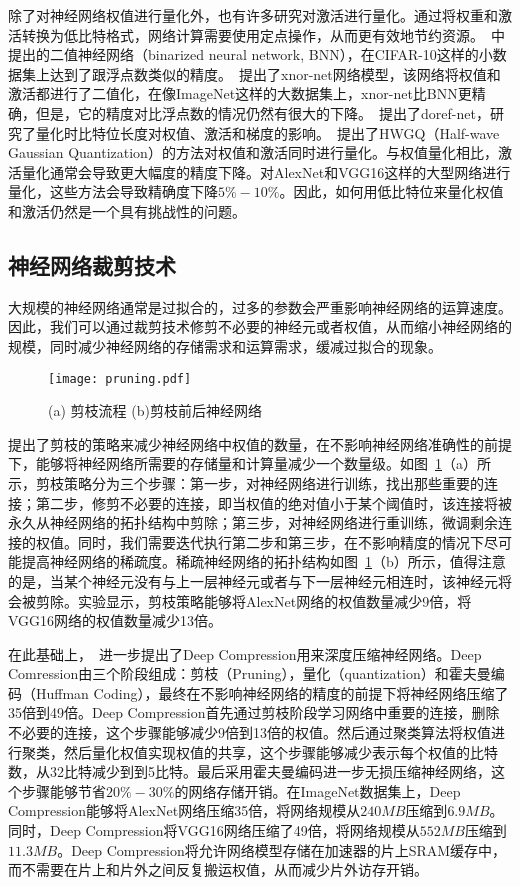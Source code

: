 除了对神经网络权值进行量化外，也有许多研究对激活进行量化。通过将权重和激活转换为低比特格式，网络计算需要使用定点操作，从而更有效地节约资源。~\citet{hubara2016binarized}中提出的二值神经网络（binarized neural network, BNN），在CIFAR-10这样的小数据集上达到了跟浮点数类似的精度。~\citet{rastegari2016xnor}提出了xnor-net网络模型，该网络将权值和激活都进行了二值化，在像ImageNet这样的大数据集上，xnor-net比BNN更精确，但是，它的精度对比浮点数的情况仍然有很大的下降。~\citet{zhou2016dorefa}提出了doref-net，研究了量化时比特位长度对权值、激活和梯度的影响。~\citet{cai2017deep}提出了HWGQ（Half-wave Gaussian Quantization）的方法对权值和激活同时进行量化。与权值量化相比，激活量化通常会导致更大幅度的精度下降。对AlexNet和VGG16这样的大型网络进行量化，这些方法会导致精确度下降$5\% - 10\%$。因此，如何用低比特位来量化权值和激活仍然是一个具有挑战性的问题。


\subsection{神经网络裁剪技术}
大规模的神经网络通常是过拟合的，过多的参数会严重影响神经网络的运算速度。因此，我们可以通过裁剪技术修剪不必要的神经元或者权值，从而缩小神经网络的规模，同时减少神经网络的存储需求和运算需求，缓减过拟合的现象。

\begin{figure}[h]
\centering
\texttt{[image: pruning.pdf]}
\caption{\footnotesize (a) 剪枝流程 (b)剪枝前后神经网络}
\label{fig:pruning1}
\end{figure}


\citet{han2015learning}提出了剪枝的策略来减少神经网络中权值的数量，在不影响神经网络准确性的前提下，能够将神经网络所需要的存储量和计算量减少一个数量级。如图~\ref{fig:pruning1}（a）所示，剪枝策略分为三个步骤：第一步，对神经网络进行训练，找出那些重要的连接；第二步，修剪不必要的连接，即当权值的绝对值小于某个阈值时，该连接将被永久从神经网络的拓扑结构中剪除；第三步，对神经网络进行重训练，微调剩余连接的权值。同时，我们需要迭代执行第二步和第三步，在不影响精度的情况下尽可能提高神经网络的稀疏度。稀疏神经网络的拓扑结构如图~\ref{fig:pruning1}（b）所示，值得注意的是，当某个神经元没有与上一层神经元或者与下一层神经元相连时，该神经元将会被剪除。实验显示，剪枝策略能够将AlexNet网络的权值数量减少9倍，将VGG16网络的权值数量减少13倍。

在此基础上，~\citet{han2015deep}进一步提出了Deep Compression用来深度压缩神经网络。Deep Comression由三个阶段组成：剪枝（Pruning），量化（quantization）和霍夫曼编码（Huffman Coding），最终在不影响神经网络的精度的前提下将神经网络压缩了35倍到49倍。Deep Compression首先通过剪枝阶段学习网络中重要的连接，删除不必要的连接，这个步骤能够减少9倍到13倍的权值。然后通过聚类算法将权值进行聚类，然后量化权值实现权值的共享，这个步骤能够减少表示每个权值的比特数，从32比特减少到到5比特。最后采用霍夫曼编码进一步无损压缩神经网络，这个步骤能够节省$20\%-30\%$的网络存储开销。在ImageNet数据集上，Deep Compression能够将AlexNet网络压缩35倍，将网络规模从$240MB$压缩到$6.9MB$。同时，Deep Compression将VGG16网络压缩了49倍，将网络规模从$552MB$压缩到$11.3MB$。Deep Compression将允许网络模型存储在加速器的片上SRAM缓存中，而不需要在片上和片外之间反复搬运权值，从而减少片外访存开销。

